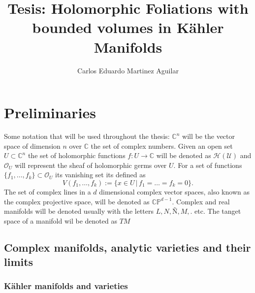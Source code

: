 \documentclass[letterpaper]{book}
\author{Carlos Eduardo Martinez Aguilar}
\title{Tesis: Holomorphic Foliations with bounded volumes in Kähler Manifolds}
\newcommand{\co}{\ensuremath{\mathbb C }}
\newcommand{\con}{\ensuremath{\mathbb{C}^n}}
\newcommand{\cp}{\ensuremath{\mathbb{CP}}}
\begin{document}
\maketitle
\tableofcontents
\newpage

\chapter{Preliminaries}
Some notation that will be used throughout the thesis: $\con$ will be the vector space of dimension $n$ over $\co$ the set of complex numbers. Given an open set $U\subset\con$ the set of holomorphic functions $f:U\rightarrow\co$ will be denoted as $\mathcal{H(U)}$ and $\mathcal{O}_{U}$ will represent the sheaf of holomorphic germs over $U$.
For a set of functions $\{f_{1},\dots,f_{k}\}\subset\mathcal{O}_{U}$ its vanishing set its defined as
\[
  V(f_{1},\dots,f_{k}):=\{x\in U\,\vert\,f_{1}=\dots =f_{k}=0\}.
\]
The set of complex lines in a $d$ dimensional complex vector spaces, also known as the complex projective space, will be denoted as $\cp^{d-1}$. Complex and real manifolds will be denoted usually with the letters $L, N, Ñ, M,$. etc. The tanget space of a manifold wil be denoted as $TM$
\section{Complex manifolds, analytic varieties and their limits}
\subsection{Kähler manifolds and varieties}
\end{document}
